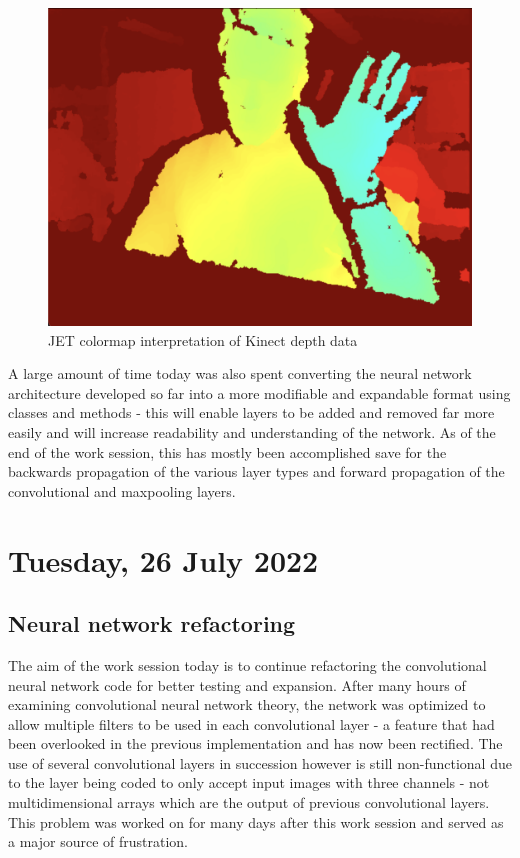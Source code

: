 \begin{figure}[h]
    \centering
    \includegraphics[width=0.6\linewidth]{figures/kinect_colormap.png}
    \caption{JET colormap interpretation of Kinect depth data}
    \label{fig:kinect_colormap}
\end{figure}

A large amount of time today was also spent converting the neural network architecture developed so far into a more modifiable and expandable format using classes and methods - this will enable layers to be added and removed far more easily and will increase readability and understanding of the network. As of the end of the work session, this has mostly been accomplished save for the backwards propagation of the various layer types and forward propagation of the convolutional and maxpooling layers.

\section[2022/07/26]{Tuesday, 26 July 2022}

\subsection{Neural network refactoring }

The aim of the work session today is to continue refactoring the convolutional neural network code for better testing and expansion. After many hours of examining convolutional neural network theory, the network was optimized to allow multiple filters to be used in each convolutional layer - a feature that had been overlooked in the previous implementation and has now been rectified. The use of several convolutional layers in succession however is still non-functional due to the layer being coded to only accept input images with three channels - not multidimensional arrays which are the output of previous convolutional layers. This problem was worked on for many days after this work session and served as a major source of frustration.

